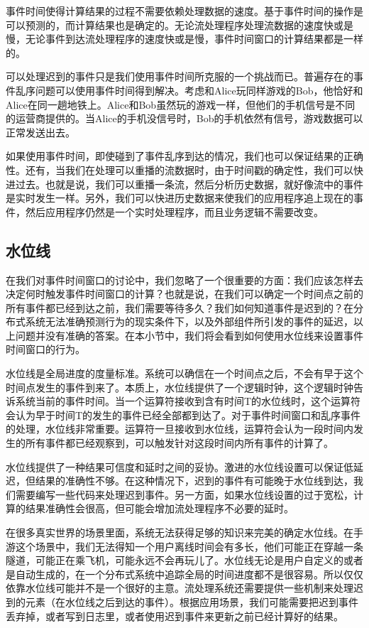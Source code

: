 \documentclass[cn,11pt,chinese]{elegantbook}
\begin{document}
事件时间使得计算结果的过程不需要依赖处理数据的速度。基于事件时间的操作是可以预测的，而计算结果也是确定的。无论流处理程序处理流数据的速度快或是慢，无论事件到达流处理程序的速度快或是慢，事件时间窗口的计算结果都是一样的。

可以处理迟到的事件只是我们使用事件时间所克服的一个挑战而已。普遍存在的事件乱序问题可以使用事件时间得到解决。考虑和Alice玩同样游戏的Bob，他恰好和Alice在同一趟地铁上。Alice和Bob虽然玩的游戏一样，但他们的手机信号是不同的运营商提供的。当Alice的手机没信号时，Bob的手机依然有信号，游戏数据可以正常发送出去。

如果使用事件时间，即使碰到了事件乱序到达的情况，我们也可以保证结果的正确性。还有，当我们在处理可以重播的流数据时，由于时间戳的确定性，我们可以快进过去。也就是说，我们可以重播一条流，然后分析历史数据，就好像流中的事件是实时发生一样。另外，我们可以快进历史数据来使我们的应用程序追上现在的事件，然后应用程序仍然是一个实时处理程序，而且业务逻辑不需要改变。

\subsection{水位线}

在我们对事件时间窗口的讨论中，我们忽略了一个很重要的方面：我们应该怎样去决定何时触发事件时间窗口的计算？也就是说，在我们可以确定一个时间点之前的所有事件都已经到达之前，我们需要等待多久？我们如何知道事件是迟到的？在分布式系统无法准确预测行为的现实条件下，以及外部组件所引发的事件的延迟，以上问题并没有准确的答案。在本小节中，我们将会看到如何使用水位线来设置事件时间窗口的行为。

水位线是全局进度的度量标准。系统可以确信在一个时间点之后，不会有早于这个时间点发生的事件到来了。本质上，水位线提供了一个逻辑时钟，这个逻辑时钟告诉系统当前的事件时间。当一个运算符接收到含有时间T的水位线时，这个运算符会认为早于时间T的发生的事件已经全部都到达了。对于事件时间窗口和乱序事件的处理，水位线非常重要。运算符一旦接收到水位线，运算符会认为一段时间内发生的所有事件都已经观察到，可以触发针对这段时间内所有事件的计算了。

水位线提供了一种结果可信度和延时之间的妥协。激进的水位线设置可以保证低延迟，但结果的准确性不够。在这种情况下，迟到的事件有可能晚于水位线到达，我们需要编写一些代码来处理迟到事件。另一方面，如果水位线设置的过于宽松，计算的结果准确性会很高，但可能会增加流处理程序不必要的延时。

在很多真实世界的场景里面，系统无法获得足够的知识来完美的确定水位线。在手游这个场景中，我们无法得知一个用户离线时间会有多长，他们可能正在穿越一条隧道，可能正在乘飞机，可能永远不会再玩儿了。水位线无论是用户自定义的或者是自动生成的，在一个分布式系统中追踪全局的时间进度都不是很容易。所以仅仅依靠水位线可能并不是一个很好的主意。流处理系统还需要提供一些机制来处理迟到的元素（在水位线之后到达的事件）。根据应用场景，我们可能需要把迟到事件丢弃掉，或者写到日志里，或者使用迟到事件来更新之前已经计算好的结果。
\end{document}
